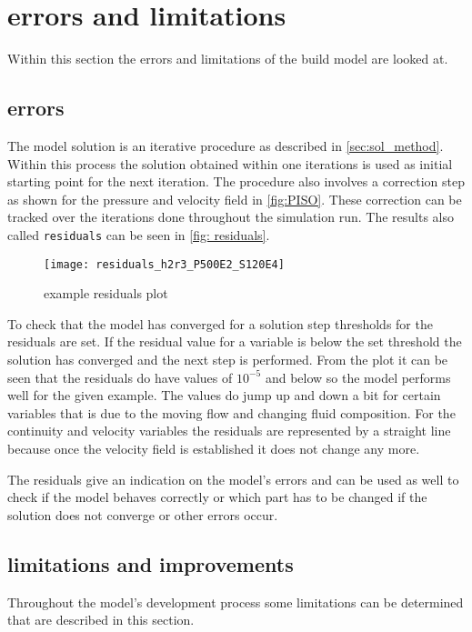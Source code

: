 \documentclass[../thesis.tex]{subfiles}
\begin{document}
\chapter{errors and limitations}
\label{chp:err_lims}

Within this section the errors and limitations of the build model are looked at.

\section{errors}

The model solution is an iterative procedure as described in \autoref{sec:sol_method}. Within this process the solution obtained within one iterations is used as initial starting point for the next iteration. The procedure also involves a correction step as shown for the pressure and velocity field in \autoref{fig:PISO}. These correction can be tracked over the iterations done throughout the simulation run. The results also called \texttt{residuals} can be seen in \autoref{fig: residuals}.
\begin{figure}[htbp]
	\centering
	\texttt{[image: residuals\_h2r3\_P500E2\_S120E4]}
	\caption{example residuals plot}
	\label{fig: residuals}
\end{figure}
To check that the model has converged for a solution step thresholds for the residuals are set. If the residual value for a variable is below the set threshold the solution has converged and the next step is performed. From the plot it can be seen that the residuals do have values of $10^{-5}$ and below so the model performs well for the given example. The values do jump up and down a bit for certain variables that is due to the moving flow and changing fluid composition. For the continuity and velocity variables the residuals are represented by a straight line because once the velocity field is established it does not change any more.

The residuals give an indication on the model's errors and can be used as well to check if the model behaves correctly or which part has to be changed if the solution does not converge or other errors occur.

\section{limitations and improvements}
Throughout the model's development process some limitations can be determined that are described in this section.
\end{document}
